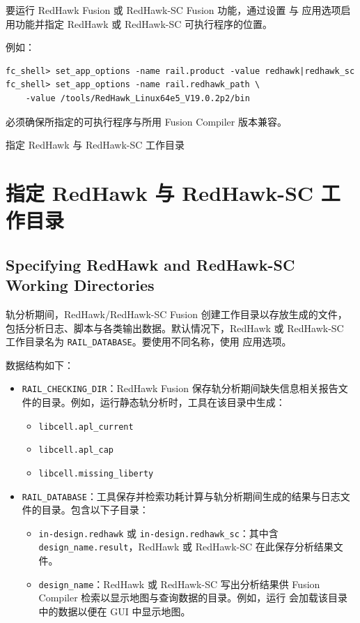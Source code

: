 要运行 RedHawk Fusion 或 RedHawk-SC Fusion 功能，通过设置  与  应用选项启用功能并指定 RedHawk 或 RedHawk-SC 可执行程序的位置。

例如：
\begin{lstlisting}
fc_shell> set_app_options -name rail.product -value redhawk|redhawk_sc
fc_shell> set_app_options -name rail.redhawk_path \
    -value /tools/RedHawk_Linux64e5_V19.0.2p2/bin
\end{lstlisting}

必须确保所指定的可执行程序与所用 Fusion Compiler 版本兼容。

\begin{seeAlsoBox}
指定 RedHawk 与 RedHawk-SC 工作目录
\end{seeAlsoBox}

\section{指定 RedHawk 与 RedHawk-SC 工作目录}
\subsection*{Specifying RedHawk and RedHawk-SC Working Directories}

轨分析期间，RedHawk/RedHawk-SC Fusion 创建工作目录以存放生成的文件，包括分析日志、脚本与各类输出数据。默认情况下，RedHawk 或 RedHawk-SC 工作目录名为 \texttt{RAIL\_DATABASE}。要使用不同名称，使用  应用选项。

数据结构如下：
\begin{itemize}
  \item \texttt{RAIL\_CHECKING\_DIR}：RedHawk Fusion 保存轨分析期间缺失信息相关报告文件的目录。例如，运行静态轨分析时，工具在该目录中生成：
    \begin{itemize}
      \item \texttt{libcell.apl\_current}
      \item \texttt{libcell.apl\_cap}
      \item \texttt{libcell.missing\_liberty}
    \end{itemize}
  \item \texttt{RAIL\_DATABASE}：工具保存并检索功耗计算与轨分析期间生成的结果与日志文件的目录。包含以下子目录：
    \begin{itemize}
      \item \texttt{in-design.redhawk} 或 \texttt{in-design.redhawk\_sc}：其中含 \texttt{design\_name.result}，RedHawk 或 RedHawk-SC 在此保存分析结果文件。
      \item \texttt{design\_name}：RedHawk 或 RedHawk-SC 写出分析结果供 Fusion Compiler 检索以显示地图与查询数据的目录。例如，运行 \cmd{open\_rail\_result} 会加载该目录中的数据以便在 GUI 中显示地图。
    \end{itemize}
\end{itemize}

